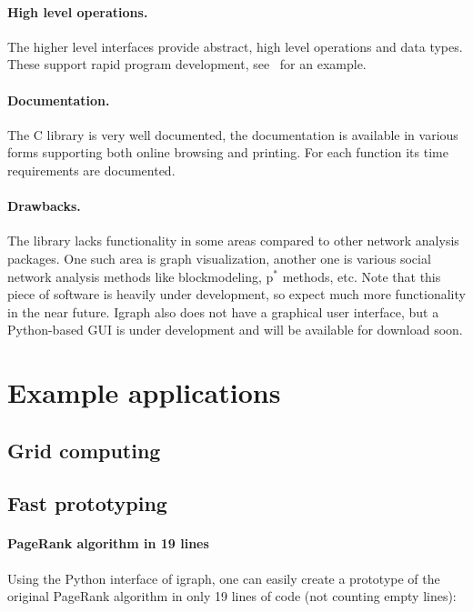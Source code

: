 \documentclass[twoside]{book}%
\begin{document}
\paragraph{High level operations.} The higher level interfaces provide
abstract, high level operations and data types. These support rapid
program development, see~ for an example.

\paragraph{Documentation.} The C library is very well documented, the
documentation is available in various forms supporting both online
browsing and printing. For each function its time requirements are
documented.

\paragraph{Drawbacks.} The library lacks functionality in some areas
compared to other network analysis packages. One such area is graph
visualization, another one is various social network analysis methods
like blockmodeling, p$^{*}$ methods, etc. Note that this piece of
software is heavily under development, so expect much more
functionality in the near future. Igraph also does not have a
graphical user interface, but a Python-based GUI is under development
and will be available for download soon.

\section{Example applications}

\subsection{Grid computing}

\subsection{Fast prototyping}

\paragraph{PageRank algorithm in 19 lines} Using the Python interface
of igraph, one can easily create a prototype of the original PageRank
algorithm in only 19 lines of code (not counting empty lines):
\end{document}
